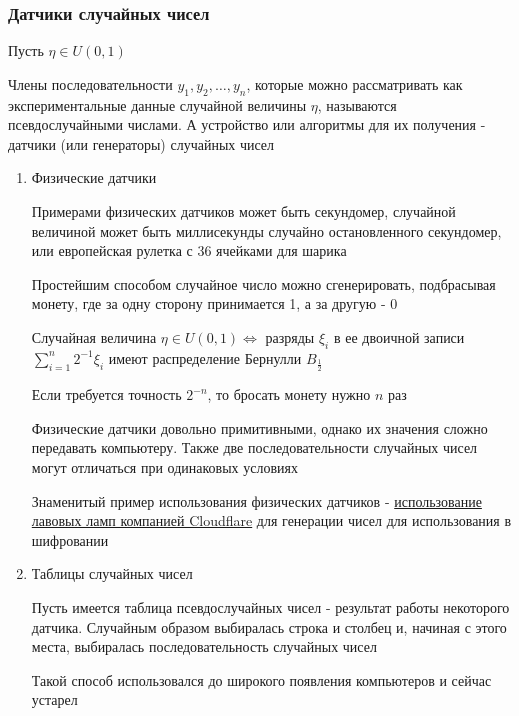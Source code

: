 \documentclass[12pt]{article}
\begin{document}
\subsubsection{Датчики случайных чисел}

Пусть $\eta \in U(0, 1)$

\Def Члены последовательности $y_1, y_2, \dots, y_n$, которые можно рассматривать как экспериментальные данные случайной величины $\eta$, называются псевдослучайными числами. А устройство или алгоритмы для их получения - датчики (или генераторы) случайных чисел

\begin{enumerate}[label*=\Roman*. ]
    \item Физические датчики

    Примерами физических датчиков может быть секундомер, случайной величиной может быть миллисекунды случайно остановленного секундомер, или европейская рулетка с 36 ячейками для шарика

    Простейшим способом случайное число можно сгенерировать, подбрасывая монету, где за одну сторону принимается 1, а за другую - 0

    \begin{MyTheorem}
        \Ths Случайная величина $\eta \in U(0, 1) \Longleftrightarrow$ разряды $\xi_i$ в ее двоичной записи $\sum_{i = 1}^n 2^{-1} \xi_i$ имеют распределение Бернулли $B_{\frac{1}{2}}$
    \end{MyTheorem}

    Если требуется точность $2^{-n}$, то бросать монету нужно $n$ раз 

    Физические датчики довольно примитивными, однако их значения сложно передавать компьютеру. Также две последовательности случайных чисел могут отличаться при одинаковых условиях

    Знаменитый пример использования физических датчиков - \href{https://www.cloudflare.com/learning/ssl/lava-lamp-encryption/}{использование лавовых ламп компанией Cloudflare} для генерации чисел для использования в шифровании

    \item Таблицы случайных чисел

    Пусть имеется таблица псевдослучайных чисел - результат работы некоторого датчика. Случайным образом выбиралась строка и столбец и, начиная с этого места, выбиралась последовательность случайных чисел

    Такой способ использовался до широкого появления компьютеров и сейчас устарел


\end{enumerate}
\end{document}
